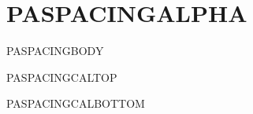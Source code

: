 \documentclass{abntexto-ufc}
\begin{document}
\textual

\section{PASPACINGALPHA}
PASPACINGBODY

\vspace{4\baselineskip}
{\onehalfsp
\noindent PASPACINGCALTOP\par
\vspace{\baselineskip}
\noindent PASPACINGCALBOTTOM\par
}
\end{document}
